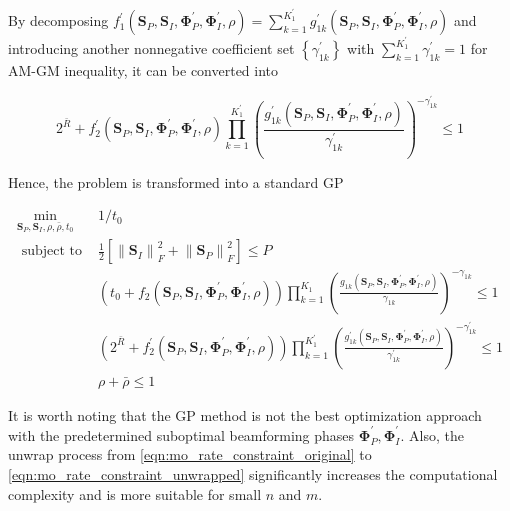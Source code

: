 By decomposing $f_1^\prime \left( {{{\mathbf{S}}_P},{{\mathbf{S}}_I},{\mathbf{\Phi }}_P^\prime ,{\mathbf{\Phi }}_I^\prime ,\rho } \right) = \sum\nolimits_{k = 1}^{K_1^\prime } {g_{1k}^\prime \left( {{{\mathbf{S}}_P},{{\mathbf{S}}_I},{\mathbf{\Phi }}_P^\prime ,{\mathbf{\Phi }}_I^\prime ,\rho } \right)} $ and introducing another nonnegative coefficient set $\left\{ {\gamma _{1k}^\prime } \right\}$ with $\sum\nolimits_{k = 1}^{K_1^\prime } {\gamma _{1k}^\prime }  = 1$ for AM-GM inequality, it can be converted into

\begin{equation}\label{eqn:mo_rate_constraint_standard}
  {2^{\bar R}} + f_2^\prime \left( {{{\mathbf{S}}_P},{{\mathbf{S}}_I},{\mathbf{\Phi }}_P^\prime ,{\mathbf{\Phi }}_I^\prime ,\rho } \right)\prod\limits_{k = 1}^{K_1^\prime } {{{\left( {\frac{{g_{1k}^\prime \left( {{{\mathbf{S}}_P},{{\mathbf{S}}_I},{\mathbf{\Phi }}_P^\prime ,{\mathbf{\Phi }}_I^\prime ,\rho } \right)}}{{\gamma _{1k}^\prime }}} \right)}^{ - \gamma _{1k}^\prime }}}  \leqslant 1
\end{equation}

Hence, the problem is transformed into a standard GP

\begin{eqnarray}
  {\mathop {\min }\limits_{{{\mathbf{S}}_P},{{\mathbf{S}}_I},\rho ,\bar \rho ,{t_0}} }&{1/{t_0}} \label{eqn:mo_target} \\
  {{\text{ subject to }}}&{\frac{1}{2}\left[ {\left\| {{{\mathbf{S}}_I}} \right\|_F^2 + \left\| {{{\mathbf{S}}_P}} \right\|_F^2} \right] \leqslant P} \label{eqn:mo_power_constraint} \\
  {}&{\left( {{t_0} + {f_2}\left( {{{\mathbf{S}}_P},{{\mathbf{S}}_I},{\mathbf{\Phi }}_P^\prime ,{\mathbf{\Phi }}_I^\prime ,\rho } \right)} \right)\prod\limits_{k = 1}^{{K_1}} {{{\left( {\frac{{{g_{1k}}\left( {{{\mathbf{S}}_P},{{\mathbf{S}}_I},{\mathbf{\Phi }}_P^\prime ,{\mathbf{\Phi }}_I^\prime ,\rho } \right)}}{{{\gamma _{1k}}}}} \right)}^{ - {\gamma _{1k}}}}}  \leqslant 1} \label{eqn:mo_current_constraint} \\
  {}&{\left( {{2^{\bar R}} + f_2^\prime \left( {{{\mathbf{S}}_P},{{\mathbf{S}}_I},{\mathbf{\Phi }}_P^\prime ,{\mathbf{\Phi }}_I^\prime ,\rho } \right)} \right)\prod\limits_{k = 1}^{K_1^\prime } {{{\left( {\frac{{g_{1k}^\prime \left( {{{\mathbf{S}}_P},{{\mathbf{S}}_I},{\mathbf{\Phi }}_P^\prime ,{\mathbf{\Phi }}_I^\prime ,\rho } \right)}}{{\gamma _{1k}^\prime }}} \right)}^{ - \gamma _{1k}^\prime }}}  \leqslant 1} \label{eqn:mo_rate_constraint} \\
  {}&{\rho  + \bar \rho  \leqslant 1 \label{eqn:mo_ratio_constraint}}
\end{eqnarray}

It is worth noting that the GP method is not the best optimization approach with the predetermined suboptimal beamforming phases ${\mathbf{\Phi }}_P^\prime ,{\mathbf{\Phi }}_I^\prime $. Also, the unwrap process from \eqref{eqn:mo_rate_constraint_original} to \eqref{eqn:mo_rate_constraint_unwrapped} significantly increases the computational complexity and is more suitable for small $n$ and $m$. 